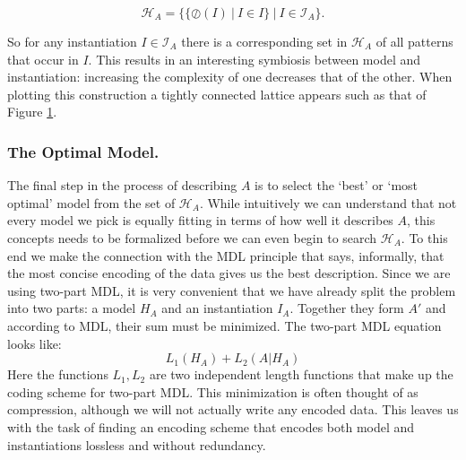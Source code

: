 \documentclass{llncs}
\begin{document}
\smallskip
$$
\mathcal{H}_A=\big\{\{\oslash({I}) \ | \ {I} \in {I} \} \ \big | \ {I} \in \mathcal{I}_A \big\}.
$$ 
\smallskip

So for any instantiation ${I}\in \mathcal{I}_A$ there is a corresponding set in $\mathcal{H}_A$ of all patterns that occur in ${I}$. This results in an interesting symbiosis between model and instantiation: increasing the complexity of one decreases that of the other. When plotting this construction a tightly connected lattice appears such as that of Figure \ref{lattice}. 

\begin{figure}

\label{lattice}
\end{figure}

\subsubsection{The Optimal Model.}

The final step in the process of describing $A$ is to select the `best' or `most optimal' model from the set of $\mathcal{H}_A$. While intuitively we can understand that not every model we pick is equally fitting in terms of how well it describes $A$, this concepts needs to be formalized before we can even begin to search $\mathcal{H}_A$. To this end we make the connection with the MDL principle that says, informally, that the most concise encoding of the data gives us the best description. Since we are using two-part MDL, it is very convenient that we have already split the problem into two parts:  a model $H_A$ and an instantiation ${I}_A$. Together they form $A'$ and according to MDL, their sum must be minimized. The two-part MDL equation looks like:
$$
L_1(H_A) + L_2(A|H_A)
$$
Here the functions $L_1, L_2$ are two independent length functions that make up the coding scheme for two-part MDL. This minimization is often thought of as compression, although we will not actually write any encoded data. This leaves us with the task of finding an encoding scheme that encodes both model and instantiations lossless and without redundancy.
\end{document}
